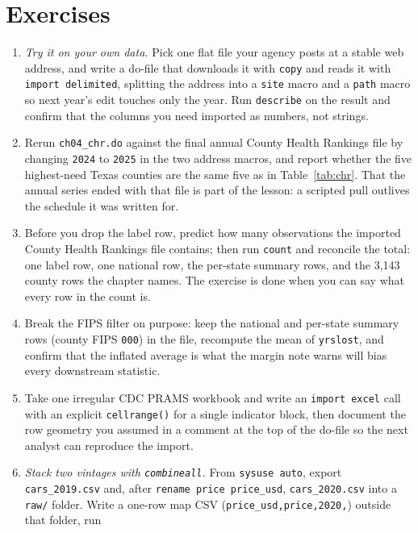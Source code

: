\documentclass[
    a4paper,
    fontsize=10pt,
    twoside=true,
    numbers=noenddot,
]{kaobook}
\begin{document}
\section*{Exercises}
\begin{enumerate}
  \item \emph{Try it on your own data.} Pick one flat file your
    agency posts at a stable web address, and write a do-file that
    downloads it with \texttt{copy} and reads it with
    \texttt{import delimited}, splitting the address into a
    \texttt{site} macro and a \texttt{path} macro so next year's
    edit touches only the year. Run \texttt{describe} on the result
    and confirm that the columns you need imported as numbers, not
    strings.
  \item Rerun \texttt{ch04\_chr.do} against the final annual County
    Health Rankings file by changing \texttt{2024} to \texttt{2025}
    in the two address macros, and report whether the five
    highest-need Texas counties are the same five as in
    Table~\ref{tab:chr}. That the annual series ended with that
    file is part of the lesson: a scripted pull outlives the
    schedule it was written for.
  \item Before you drop the label row, predict how many observations
    the imported County Health Rankings file contains; then run
    \texttt{count} and reconcile the total: one label row, one
    national row, the per-state summary rows, and the 3{,}143 county
    rows the chapter names. The exercise is done when you can
    say what every row in the count is.
  \item Break the FIPS filter on purpose: keep the national and
    per-state summary rows (county FIPS \texttt{000}) in the file,
    recompute the mean of \texttt{yrslost}, and confirm that the
    inflated average is what the margin note warns will bias every
    downstream statistic.
  \item Take one irregular CDC PRAMS workbook and write an
    \texttt{import excel} call with an explicit \texttt{cellrange()}
    for a single indicator block, then document the row geometry you
    assumed in a comment at the top of the do-file so the next
    analyst can reproduce the import.
  \item \emph{Stack two vintages with \texttt{combineall}.} From
    \texttt{sysuse auto}, export \texttt{cars\_2019.csv} and, after
    \texttt{rename price price\_usd}, \texttt{cars\_2020.csv} into a
    \texttt{raw/} folder. Write a one-row map CSV
    (\texttt{price\_usd,price,2020,}) outside that folder, run

\end{enumerate}
\end{document}
